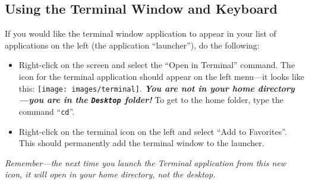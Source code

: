 \vspace{-0.2in}
\subsection*{Using the Terminal Window and Keyboard}
\vspace{-0.1in}
If you would like the terminal window application to appear in your list
of applications on the left (the application ``launcher''), do the following:
\begin{itemize}
\item
Right-click on the screen and select the ``Open in Terminal'' command.
The icon for the terminal application should appear on the left menu---it
looks like this: \texttt{[image: images/terminal]}. 
\textbf{\textit{You are not in your home directory---you are in the 
{\tt Desktop} folder!}} To get to the home folder, type the command ``{\tt cd}''.
\item
Right-click on the terminal icon on the left and select ``Add to Favorites''. This should permanently add the terminal window to the launcher.
\end{itemize}

{\em Remember---the next time you launch the Terminal application from
this new icon, it will open in your home directory, not the desktop.}

\vspace{-0.2in}
